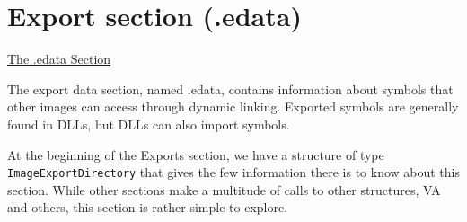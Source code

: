 \section{Export section (.edata)}
\href{https://learn.microsoft.com/en-us/windows/win32/debug/pe-format#the-edata-section-image-only}{The .edata Section}

The export data section, named .edata, contains information about symbols that other images can access through dynamic linking. Exported symbols are generally found in DLLs, but DLLs can also import symbols.

At the beginning of the Exports section, we have a structure of type \verb+ImageExportDirectory+ that gives the few information there is to know about this section. While other sections make a multitude of calls to other structures, VA and others, this section is rather simple to explore.